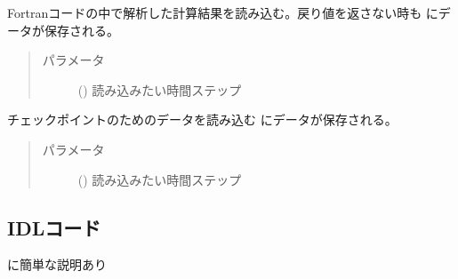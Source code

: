 \documentclass[letterpaper,10pt,dvipdfmx,report]{sphinxmanual}
\begin{document}
\begin{fulllineitems}
\label{\detokenize{io:R2D2.R2D2_data.read_vc}}
Fortranコードの中で解析した計算結果を読み込む。戻り値を返さない時も {\hyperref[\detokenize{io:R2D2.R2D2_data.vc}]{}} にデータが保存される。
\begin{quote}\begin{description}
\item[{パラメータ}] \leavevmode
{} () \sphinxhyphen{}\sphinxhyphen{} 読み込みたい時間ステップ

\end{description}\end{quote}

\end{fulllineitems}


\begin{fulllineitems}
\label{\detokenize{io:R2D2.R2D2_data.read_qq_check}}
チェックポイントのためのデータを読み込む {\hyperref[\detokenize{io:R2D2.R2D2_data.qc}]{}} にデータが保存される。
\begin{quote}\begin{description}
\item[{パラメータ}] \leavevmode
{} () \sphinxhyphen{}\sphinxhyphen{} 読み込みたい時間ステップ

\end{description}\end{quote}

\end{fulllineitems}



\subsection{IDLコード}
\label{\detokenize{io:idl}}
 に簡単な説明あり
\end{document}
